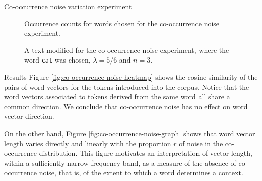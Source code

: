 \documentclass{article} %
\newcommand{\word}[1]{\texttt{#1}}
\begin{document}
\begin{section}{Co-occurrence noise variation experiment}
\begin{figure}
	
	\label{fig:co-occurrence-noise-counts}
	\caption{Occurrence counts for words chosen for the co-occurrence noise experiment. }
\end{figure}

\begin{figure}
	\begin{mdframed}
	
	\end{mdframed}
	\caption{A text modified for the co-occurrence noise experiment, where the word \word{cat} was chosen, $\lambda = 5/6$ and $n=3$.}
\label{fig:co-occurrence-noise-experiment-text}
\end{figure}

\begin{subsection}{Results}
Figure \ref{fig:co-occurrence-noise-heatmap} shows the cosine similarity of the pairs of word vectors for the tokens introduced into the corpus.
Notice that the word vectors associated to tokens derived from the same word all share a common direction.
We conclude that co-occurrence noise has no effect on word vector direction.

On the other hand, Figure \ref{fig:co-occurrence-noise-graph} shows that word vector length varies directly and linearly with the proportion $r$ of noise in the co-occurrence distribution.
This figure motivates an interpretation of vector length, within a sufficiently narrow frequency band, as a measure of the absence of co-occurrence noise, that is, of the extent to which a word determines a context.



\end{subsection}
\end{section}
\end{document}
